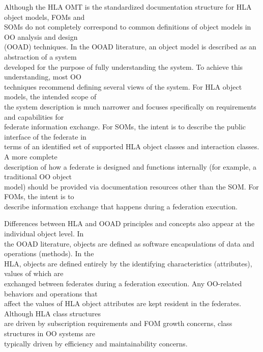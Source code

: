 \vspace{3.4pt}
\vspace{1.3pt}
Although the HLA OMT is the standardized documentation structure for HLA object models, FOMs and\\
SOMs do not completely correspond to common definitions of object models in OO analysis and design\\
(OOAD) techniques. In the OOAD literature, an object model is described as an abstraction of a system\\
developed for the purpose of fully understanding the system. To achieve this understanding, most OO\\
techniques recommend defining several views of the system. For HLA object models, the intended scope of\\
the system description is much narrower and focuses specifically on requirements and capabilities for\\
federate information exchange. For SOMs, the intent is to describe the public interface of the federate in\\
terms of an identified set of supported HLA object classes and interaction classes. A more complete\\
description of how a federate is designed and functions internally (for example, a traditional OO object\\
model) should be provided via documentation resources other than the SOM. For FOMs, the intent is to\\
describe information exchange that happens during a federation execution.

\vspace{6pt}
Differences between HLA and OOAD principles and concepts also appear at the individual object level. In\\
the OOAD literature, objects are defined as software encapsulations of data and operations (methods). In the\\
HLA, objects are defined entirely by the identifying characteristics (attributes), values of which are\\
exchanged between federates during a federation execution. Any OO-related behaviors and operations that\\
affect the values of HLA object attributes are kept resident in the federates. Although HLA class structures\\
are driven by subscription requirements and FOM growth concerns, class structures in OO systems are\\
typically driven by efficiency and maintainability concerns.

